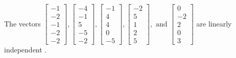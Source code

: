 \begin{exercise}
\begin{exerciseStatement}
  \end{exerciseStatement}
  \begin{exerciseAnswer}
   The vectors \(\left[\begin{array}{r}
-1 \\
-2 \\
-1 \\
-2 \\
-2
\end{array}\right] , \left[\begin{array}{r}
-4 \\
-1 \\
5 \\
-5 \\
-2
\end{array}\right] , \left[\begin{array}{r}
-1 \\
4 \\
4 \\
0 \\
-5
\end{array}\right] , \left[\begin{array}{r}
-2 \\
5 \\
1 \\
2 \\
5
\end{array}\right] , \text{ and } \left[\begin{array}{r}
0 \\
-2 \\
2 \\
0 \\
3
\end{array}\right]\) are 
  	 linearly independent  .
  


  \end{exerciseAnswer}
\end{exercise}